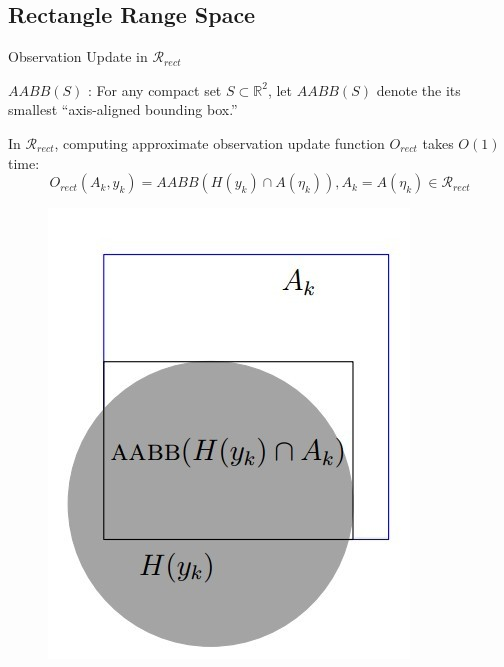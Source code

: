 \documentclass[10pt]{beamer}
\begin{document}
\subsection[Rectangle Range Space]{Rectangle Range Space}
\begin{frame}{Observation Update in $\mathcal{R}_{rect}$}
  \begin{definition}{\textbf{$AABB(S)$} :}
    For any compact set $S \subset \mathbb{R}^2$, let $AABB(S)$ denote the its
    smallest ``axis-aligned bounding box.''
  \end{definition}

  In $\mathcal{R}_{rect}$, computing approximate observation update function $O_{rect}$ takes $O(1)$ time:\\
  $$ O_{rect}(A_k, y_k) = AABB(H(y_k) \cap A(\eta_k)), A_k = A(\eta_k) \in \mathcal{R}_{rect}$$
  \begin{figure}
    \includegraphics[scale=0.27]{figs/circlerect.jpg}
  \end{figure}
\end{frame}
\end{document}
